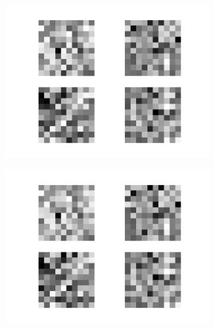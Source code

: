 \begin{figure}[h!]
	\begin{subfigure}[t]{.19\textwidth}
  		\centering
  		\includegraphics[width=\linewidth]{imgs/inspect/00015.png}
  		\label{fig:sub1}
	\end{subfigure}%
	\begin{subfigure}[t]{.19\textwidth}
  		\centering
  		\includegraphics[width=\linewidth]{imgs/inspect/00016.png}
  		\label{fig:sub1}
	\end{subfigure}%
	\begin{subfigure}[t]{.19\textwidth}
  		\centering

\end{subfigure}
\end{figure}
